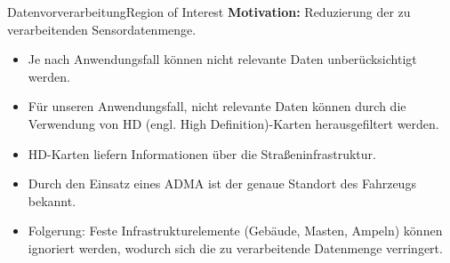 \documentclass[169, handout	]{THIbeamer} %
\begin{document}
	\begin{frame}{Datenvorverarbeitung}{Region of Interest}
		\textbf{Motivation:} Reduzierung der zu verarbeitenden Sensordatenmenge.
		\begin{itemize}
			\item Je nach Anwendungsfall können nicht relevante Daten unberücksichtigt werden.
			\item Für unseren Anwendungsfall, nicht relevante Daten können durch die Verwendung von HD (engl. High Definition)-Karten herausgefiltert werden.
			\item HD-Karten liefern Informationen über die Straßeninfrastruktur.
			\item Durch den Einsatz eines ADMA ist der genaue Standort des Fahrzeugs bekannt.
			\item Folgerung: Feste Infrastrukturelemente (Gebäude, Masten, Ampeln) können ignoriert werden, wodurch sich die zu verarbeitende Datenmenge verringert.
		\end{itemize}
	\end{frame}
\end{document}
